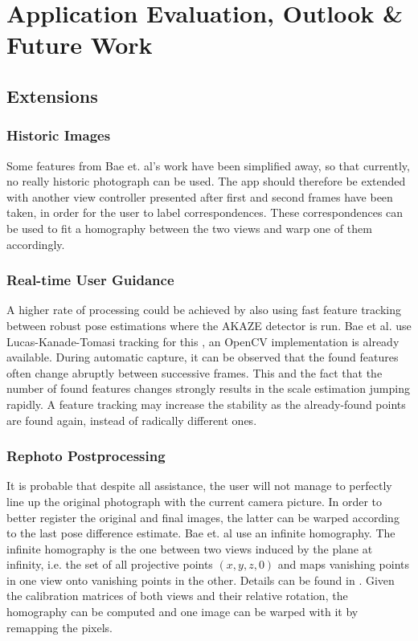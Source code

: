 \chapter{Application Evaluation, Outlook \& Future Work}\label{ch:outlook}

\section{Extensions}

\subsection*{Historic Images}

Some features from Bae et. al's work have been simplified away, so that
currently, no really historic photograph can be used. The app should therefore
be extended with another view controller presented after first and second frames
have been taken, in order for the user to label correspondences. These
correspondences can be used to fit a homography between the two views and warp
one of them accordingly.

\subsection*{Real-time User Guidance}

A higher rate of processing could be achieved by also using fast feature
tracking between robust pose estimations where the AKAZE detector is run. Bae et
al. use Lucas-Kanade-Tomasi tracking for this \citep{lucas1981,tomasi1991}, an
OpenCV implementation is already available. During automatic capture, it can be
observed that the found features often change abruptly between successive
frames. This and the fact that the number of found features changes strongly
results in the scale estimation jumping rapidly. A feature tracking may increase
the stability as the already-found points are found again, instead of radically
different ones.

\subsection*{Rephoto Postprocessing}

It is probable that despite all assistance, the user will not manage to
perfectly line up the original photograph with the current camera picture.  In
order to better register the original and final images, the latter can be warped
according to the last pose difference estimate. Bae et. al use an infinite
homography. The infinite homography is the one between two views induced by the
plane at infinity, i.e.  the set of all projective points $(x,y,z,0)$ and maps
vanishing points in one view onto vanishing points in the other. Details can be
found in \citep[ch. 13.4]{h&z2004}.  Given the calibration matrices of both
views and their relative rotation, the homography can be computed and one image
can be warped with it by remapping the pixels.

